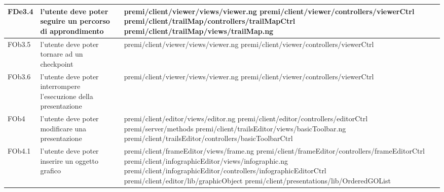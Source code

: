 \begin{longtable}{|l|p{5cm}|p{7cm}|}
\hline
FDe3.4 & l'utente deve poter seguire un percorso di approndimento & \hspace{0pt}premi/client/viewer/views/viewer.ng \linebreak \linebreak premi/client/viewer/controllers/viewerCtrl \linebreak \linebreak premi/client/trailMap/controllers/trailMapCtrl \linebreak \linebreak premi/client/trailMap/views/trailMap.ng \\
\hline
FOb3.5 & l'utente deve poter tornare ad un checkpoint & \hspace{0pt}premi/client/viewer/views/viewer.ng \linebreak \linebreak premi/client/viewer/controllers/viewerCtrl \\
\hline
FOb3.6 & l'utente deve poter interrompere l'esecuzione della presentazione & \hspace{0pt}premi/client/viewer/views/viewer.ng \linebreak \linebreak premi/client/viewer/controllers/viewerCtrl \\
\hline
FOb4 & l'utente deve poter modificare una presentazione & \hspace{0pt}premi/client/editor/views/editor.ng \linebreak \linebreak premi/client/editor/controllers/editorCtrl  \linebreak \linebreak premi/server/methods \linebreak \linebreak premi/client/trailsEditor/views/basicToolbar.ng \linebreak \linebreak premi/client/trailsEditor/controllers/basicToolbarCtrl \\
\hline
FOb4.1 & l'utente deve poter inserire un oggetto grafico & \hspace{0pt}premi/client/frameEditor/views/frame.ng \linebreak \linebreak premi/client/frameEditor/controllers/frameEditorCtrl \linebreak \linebreak premi/client/infographicEditor/views/infographic.ng \linebreak \linebreak premi/client/infographicEditor/controllers/infographicEditorCtrl \linebreak \linebreak premi/client/editor/lib/graphicObject \linebreak \linebreak premi/client/presentations/lib/OrderedGOList \\

\end{longtable}
